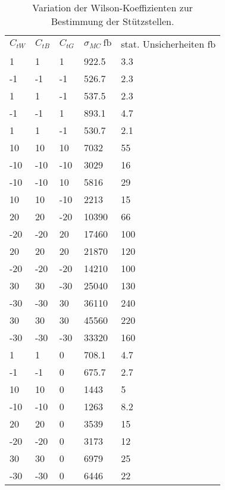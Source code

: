 \begin{table}
  \centering
  \caption{Variation der Wilson-Koeffizienten zur Bestimmung der Stützstellen.}
  \begin{tabular}{lllll}
    \toprule
    $C_{tW}$ & $C_{tB}$ & $C_{tG}$ & $\sigma_{MC}~\si{\femto\barn}$ & stat. Unsicherheiten $\si{\femto\barn}$\\
  1     &    1      &     1      &      922.5  &     3.3\\
  -1    &    -1     &     -1     &      526.7  &     2.3\\
  1     &    1      &     -1     &      537.5  &     2.3\\
  -1    &     -1    &      1     &      893.1  &     4.7\\
  1     &     1     &      -1    &      530.7  &     2.1\\
  10    &    10     &     10     &      7032   &     55\\
  -10   &    -10    &     -10    &      3029   &     16\\
  -10   &     -10   &      10    &      5816   &     29\\
  10    &    10     &     -10    &      2213   &     15\\
  20    &    20     &     -20    &      10390  &     66\\
  -20   &    -20    &     20     &      17460  &     100\\
  20    &    20     &     20     &      21870  &     120\\
  -20   &    -20    &     -20    &      14210  &     100\\
  30    &    30     &     -30    &      25040  &     130\\
  -30   &    -30    &     30     &      36110  &     240\\
  30    &    30     &     30     &      45560  &     220\\
  -30   &    -30    &     -30    &      33320  &     160\\
  1     &    1      &     0      &      708.1  &     4.7\\
  -1    &    -1     &     0      &      675.7  &     2.7\\
  10    &    10     &     0      &      1443   &     5\\
  -10   &    -10    &     0      &      1263   &     8.2\\
  20    &    20     &     0      &      3539   &     15\\
  -20   &    -20    &     0      &      3173   &     12\\
  30    &    30     &     0      &      6979   &     25\\
  -30   &    -30    &     0      &      6446   &     22\\
    \bottomrule
  \end{tabular}
  \label{tab:lit2}
\end{table}
